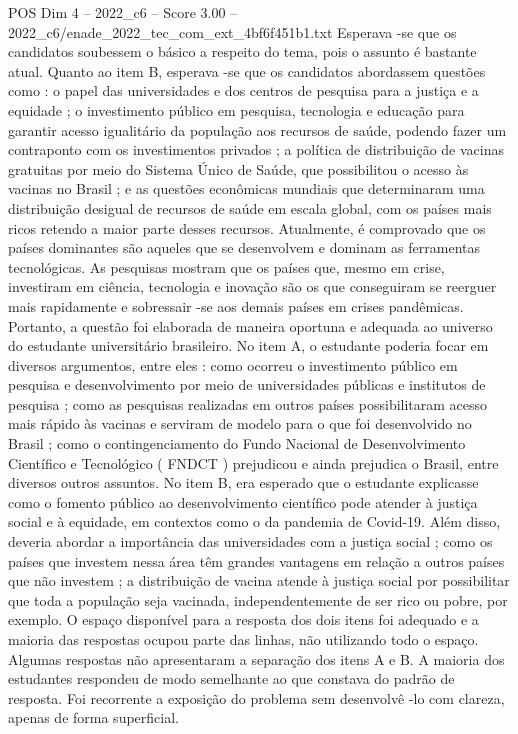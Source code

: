 \begin{textsample}{POS Dim 4 – 2022\_c6 – Score 3.00 – 2022\_c6/enade\_2022\_tec\_com\_ext\_4bf6f451b1.txt}
Esperava -se que os candidatos soubessem o básico a respeito do tema, pois o assunto é bastante atual.
Quanto ao item B, esperava -se que os candidatos abordassem questões como : o papel das universidades e dos centros de pesquisa para a justiça e a equidade ; o investimento público em pesquisa, tecnologia e educação para garantir acesso igualitário da população aos recursos de saúde, podendo fazer um contraponto com os investimentos privados ; a política de distribuição de vacinas gratuitas por meio do Sistema Único de Saúde, que possibilitou o acesso às vacinas no Brasil ; e as questões econômicas mundiais que determinaram uma distribuição desigual de recursos de saúde em escala global, com os países mais ricos retendo a maior parte desses recursos.
Atualmente, é comprovado que os países dominantes são aqueles que se desenvolvem e dominam as ferramentas tecnológicas.
As pesquisas mostram que os países que, mesmo em crise, investiram em ciência, tecnologia e inovação são os que conseguiram se reerguer mais rapidamente e sobressair -se aos demais países em crises pandêmicas.
Portanto, a questão foi elaborada de maneira oportuna e adequada ao universo do estudante universitário brasileiro.
No item A, o estudante poderia focar em diversos argumentos, entre eles : como ocorreu o investimento público em pesquisa e desenvolvimento por meio de universidades públicas e institutos de pesquisa ; como as pesquisas realizadas em outros países possibilitaram acesso mais rápido às vacinas e serviram de modelo para o que foi desenvolvido no Brasil ; como o contingenciamento do Fundo Nacional de Desenvolvimento Científico e Tecnológico ( FNDCT ) prejudicou e ainda prejudica o Brasil, entre diversos outros assuntos.
No item B, era esperado que o estudante explicasse como o fomento público ao desenvolvimento científico pode atender à justiça social e à equidade, em contextos como o da pandemia de Covid-19.
Além disso, deveria abordar a importância das universidades com a justiça social ; como os países que investem nessa área têm grandes vantagens em relação a outros países que não investem ; a distribuição de vacina atende à justiça social por possibilitar que toda a população seja vacinada, independentemente de ser rico ou pobre, por exemplo.
O espaço disponível para a resposta dos dois itens foi adequado e a maioria das respostas ocupou parte das linhas, não utilizando todo o espaço.
Algumas respostas não apresentaram a separação dos itens A e B.
A maioria dos estudantes respondeu de modo semelhante ao que constava do padrão de resposta.
Foi recorrente a exposição do problema sem desenvolvê -lo com clareza, apenas de forma superficial.

\end{textsample}
